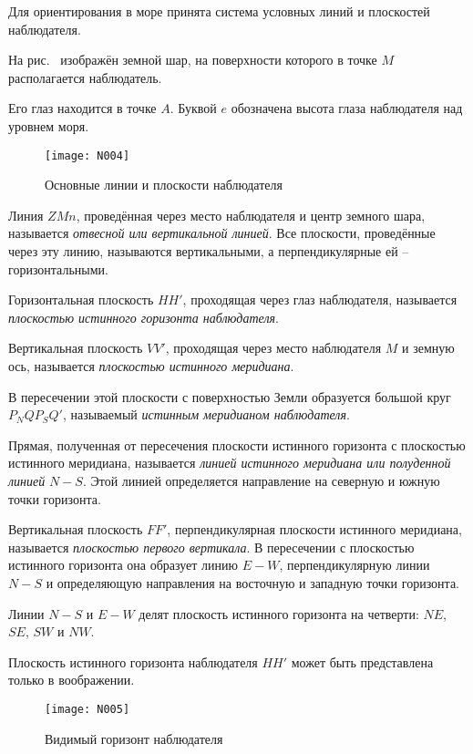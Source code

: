 Для ориентирования в море принята система условных линий и плоскостей
наблюдателя.

На рис.~ изображён земной шар, на поверхности которого в точке
$M$ располагается наблюдатель.

Его глаз находится в точке $A$. Буквой $e$ обозначена высота глаза
наблюдателя над уровнем моря.

\begin{figure}[htb]
  \centering{}
  \texttt{[image: N004]}
  \caption{Основные линии и плоскости наблюдателя}
  \label{fig:N4}
\end{figure}

Линия $ZMn$, проведённая через место наблюдателя и центр земного шара,
называется \textit{отвесной или вертикальной линией}. Все плоскости,
проведённые через эту линию, называются вертикальными, а
перпендикулярные ей \--- горизонтальными.

Горизонтальная плоскость $HH'$, проходящая через глаз наблюдателя,
называется \textit{плоскостью истинного горизонта наблюдателя}.

Вертикальная плоскость $VV'$, проходящая через место наблюдателя $M$ и
земную ось, называется \textit{плоскостью истинного меридиана}.

В пересечении этой плоскости с поверхностью Земли образуется большой
круг $P_NQP_SQ'$, называемый \textit{истинным меридианом наблюдателя}.

Прямая, полученная от пересечения плоскости истинного горизонта с
плоскостью истинного меридиана, называется \textit{линией истинного меридиана
или полуденной линией} $N-S$. Этой линией определяется направление на
северную и южную точки горизонта.

Вертикальная плоскость $FF'$, перпендикулярная плоскости истинного
меридиана, называется \textit{плоскостью первого вертикала}. В пересечении с
плоскостью истинного горизонта она образует линию $E-W$,
перпендикулярную линии $N-S$ и определяющую направления на восточную и
западную точки горизонта.

Линии $N-S$ и $E-W$ делят плоскость истинного горизонта на четверти:
$NE$, $SE$, $SW$ и $NW$.

Плоскость истинного горизонта наблюдателя $HH'$ может быть
представлена только в воображении.

\begin{figure}[htb]
  \centering{}
  \texttt{[image: N005]}
  \caption{Видимый горизонт наблюдателя}
  \label{fig:N5}
\end{figure}

